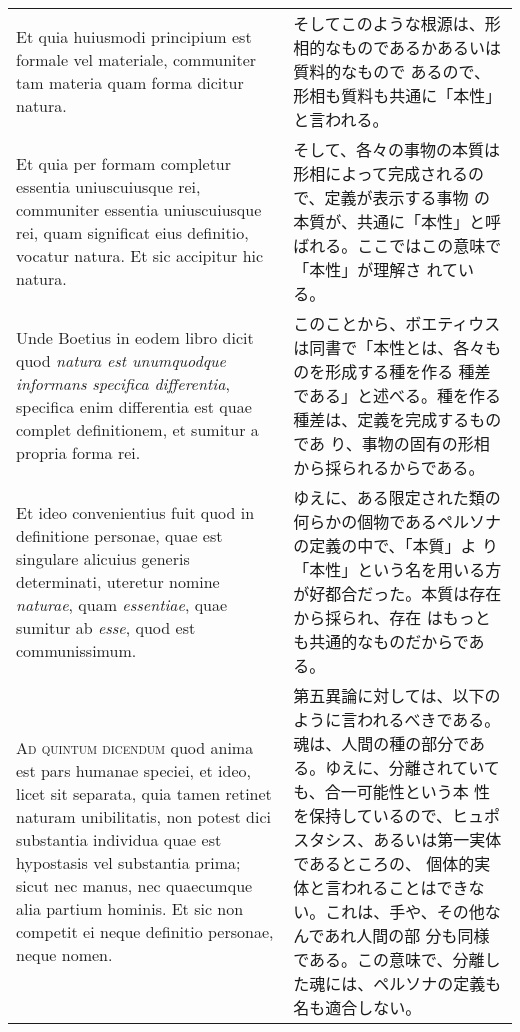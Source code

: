 \documentclass[10pt]{jsarticle} %
\begin{document}
\begin{longtable}{p{21em}p{21em}}
 Et
quia huiusmodi principium est formale vel materiale, communiter tam
materia quam forma dicitur natura. 


&

そしてこのような根源は、形相的なものであるかあるいは質料的なもので
 あるので、形相も質料も共通に「本性」と言われる。

\\


Et quia per formam completur essentia
uniuscuiusque rei, communiter essentia uniuscuiusque rei, quam
significat eius definitio, vocatur natura. Et sic accipitur hic
natura. 


&

そして、各々の事物の本質は形相によって完成されるので、定義が表示する事物
 の本質が、共通に「本性」と呼ばれる。ここではこの意味で「本性」が理解さ
 れている。


\\


Unde Boetius in eodem libro dicit quod {\itshape natura est unumquodque
informans specifica differentia}, specifica enim differentia est quae
complet definitionem, et sumitur a propria forma rei. 


&

このことから、ボエティウスは同書で「本性とは、各々ものを形成する種を作る
 種差である」と述べる。種を作る種差は、定義を完成するものであ
 り、事物の固有の形相から採られるからである。



\\


Et ideo
convenientius fuit quod in definitione personae, quae est singulare
alicuius generis determinati, uteretur nomine {\itshape naturae}, quam {\itshape essentiae},
quae sumitur ab {\itshape esse}, quod est communissimum.


&

ゆえに、ある限定された類の何らかの個物であるペルソナの定義の中で、「本質」よ
 り「本性」という名を用いる方が好都合だった。本質は存在から採られ、存在
 はもっとも共通的なものだからである。


\\



{\scshape Ad quintum dicendum} quod anima est pars humanae speciei, et ideo, licet
sit separata, quia tamen retinet naturam unibilitatis, non potest dici
substantia individua quae est hypostasis vel substantia prima; sicut nec
manus, nec quaecumque alia partium hominis. Et sic non competit ei neque
definitio personae, neque nomen.


&

第五異論に対しては、以下のように言われるべきである。
魂は、人間の種の部分である。ゆえに、分離されていても、合一可能性という本
 性を保持しているので、ヒュポスタシス、あるいは第一実体であるところの、
 個体的実体と言われることはできない。これは、手や、その他なんであれ人間の部
 分も同様である。この意味で、分離した魂には、ペルソナの定義も名も適合しない。

\end{longtable}
\newpage
\end{document}
